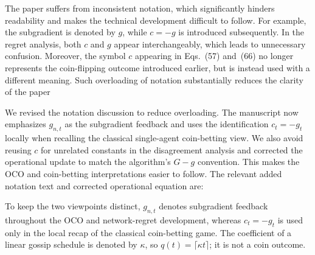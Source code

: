 \documentclass[12pt,english]{reviewresponse}
\begin{document}
\begin{revcomment}
    The paper suffers from inconsistent notation, which significantly hinders readability and makes the technical development difficult to follow. For example, the subgradient is denoted by $g$, while $c = -g$ is introduced subsequently. In the regret analysis, both $c$ and $g$ appear interchangeably, which leads to unnecessary confusion. Moreover, the symbol $c$ appearing in Eqs.~(57) and~(66) no longer represents the coin-flipping outcome introduced earlier, but is instead used with a different meaning. Such overloading of notation substantially reduces the clarity of the paper
\end{revcomment}
\begin{revresponse}
    We revised the notation discussion to reduce overloading.  The manuscript now emphasizes $g_{n,t}$ as the subgradient feedback and uses the identification $c_t=-g_t$ locally when recalling the classical single-agent coin-betting view.  We also avoid reusing $c$ for unrelated constants in the disagreement analysis and corrected the operational update to match the algorithm's $G-g$ convention.  This makes the OCO and coin-betting interpretations easier to follow.
    The relevant added notation text and corrected operational equation are:
    \begin{changes}
        To keep the two viewpoints distinct, $g_{n,t}$ denotes subgradient feedback throughout the OCO and network-regret development, whereas $c_t=-g_t$ is used only in the local recap of the classical coin-betting game.
        The coefficient of a linear gossip schedule is denoted by $\kappa$, so $q(t)=\lceil\kappa t\rceil$; it is not a coin outcome.


\end{changes}
\end{revresponse}
\end{document}

